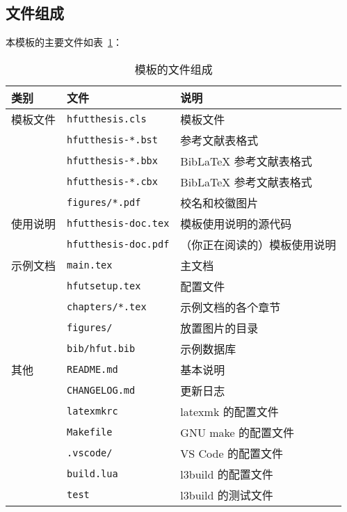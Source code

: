 \documentclass[a4paper]{ltxdoc}
\DeclareRobustCommand\file{\nolinkurl}
\begin{document}
\subsection{文件组成}
本模板的主要文件如表~\ref{tab:files}：
\begin{table}[htb]
  \centering\small
  \caption{模板的文件组成}
  \label{tab:files}
  \begin{tabular}{lll}
    \toprule
    类别     & 文件                      & 说明                         \\
    \midrule
    模板文件 & \file{hfutthesis.cls}     & 模板文件                     \\
             & \file{hfutthesis-*.bst}   & \BibTeX{} 参考文献表格式     \\
             & \file{hfutthesis-*.bbx}   & BibLaTeX 参考文献表格式      \\
             & \file{hfutthesis-*.cbx}   & BibLaTeX 参考文献表格式      \\
             & \file{figures/*.pdf} & 校名和校徽图片               \\
    \midrule
    使用说明 & \file{hfutthesis-doc.tex} & 模板使用说明的源代码         \\
             & \file{hfutthesis-doc.pdf} & （你正在阅读的）模板使用说明 \\
    \midrule
    示例文档 & \file{main.tex}           & 主文档                       \\
             & \file{hfutsetup.tex}      & 配置文件                     \\
             & \file{chapters/*.tex}     & 示例文档的各个章节           \\
             & \file{figures/}           & 放置图片的目录               \\
             & \file{bib/hfut.bib}       & \BibTeX{} 示例数据库         \\
    \midrule
    其他     & \file{README.md}          & 基本说明                     \\
             & \file{CHANGELOG.md}       & 更新日志                     \\
             & \file{latexmkrc}          & latexmk 的配置文件           \\
             & \file{Makefile}           & GNU make 的配置文件          \\
             & \file{.vscode/}           & VS Code 的配置文件           \\
             & \file{build.lua}          & l3build 的配置文件           \\
             & \file{test}               & l3build 的测试文件           \\
    \bottomrule
  \end{tabular}
\end{table}
\end{document}

